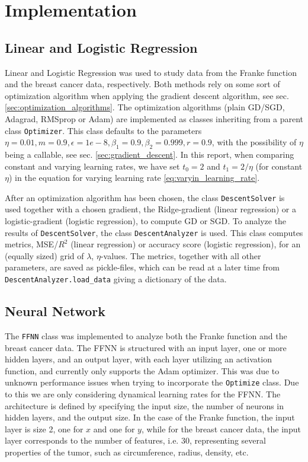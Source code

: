 \documentclass[%
reprint,s
amsmath,amssymb,
aps,
]{revtex4-2}
\begin{document}
\section{Implementation}
\subsection{Linear and Logistic Regression}
Linear and Logistic Regression was used to study data from the Franke function and the breast cancer data, respectively. Both methods rely on some sort of optimization algorithm when applying the gradient descent algorithm, see sec. \ref{sec:optimization_algorithms}. The optimization algorithms (plain GD/SGD, Adagrad, RMSprop or Adam) are implemented as classes inheriting from a parent class \texttt{Optimizer}. This class defaults to the parameters \(\eta=0.01, m=0.9, \epsilon=1e-8, \beta_1=0.9, \beta_2=0.999, r=0.9\), with the possibility of \(\eta\) being a callable, see sec. \ref{sec:gradient_descent}. In this report, when comparing constant and varying learning rates, we have set \(t_0 = 2\) and \(t_{1} = 2/\eta\) (for constant \(\eta\)) in the equation for varying learning rate \eqref{eq:varyin_learning_rate}.

After an optimization algorithm has been chosen, the class \texttt{DescentSolver} is used together with a chosen gradient, the Ridge-gradient (linear regression) or a logistic-gradient (logistic regression), to compute GD or SGD. To analyze the results of \texttt{DescentSolver}, the class \texttt{DescentAnalyzer} is used. This class computes metrics, MSE/\(R^2\) (linear regression) or accuracy score (logistic regression), for an (equally sized) grid of \(\lambda\), \(\eta\)-values. The metrics, together with all other parameters, are saved as pickle-files, which can be read at a later time from \texttt{DescentAnalyzer.load\_data} giving a dictionary of the data. 

\subsection{Neural Network}
The \texttt{FFNN} class was implemented to analyze both the Franke function and the breast cancer data. The FFNN is structured with an input layer, one or more hidden layers, and an output layer, with each layer utilizing an activation function, and currently only supports the Adam optimizer. This was due to unknown performance issues when trying to incorporate the \texttt{Optimize} class. Due to this we are only considering dynamical learning rates for the FFNN. The architecture is defined by specifying the input size, the number of neurons in hidden layers, and the output size. In the case of the Franke function, the input layer is size 2, one for \(x\) and one for \(y\), while for the breast cancer data, the input layer corresponds to the number of features, i.e. \(30\), representing several properties of the tumor, such as circumference, radius, density, etc.
\end{document}
